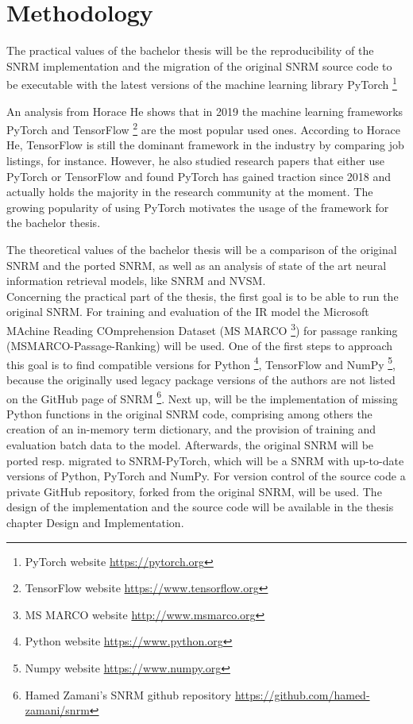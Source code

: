 \chapter{Methodology}

The practical values of the bachelor thesis will be the reproducibility of
    the SNRM implementation and the migration of the original SNRM source 
    code to be executable with the latest versions of the machine learning 
    library PyTorch \footnote{PyTorch website \url{https://pytorch.org}}  

An analysis \cite{he:2019:state-of-ml-frameworks} from Horace He shows that 
    in 2019 the machine learning frameworks PyTorch and TensorFlow 
    \footnote{TensorFlow website \url{https://www.tensorflow.org}}
    are the most popular used ones.
According to Horace He, TensorFlow is still the dominant framework
    in the industry by comparing job listings, for instance.
However, he also studied research papers that either use PyTorch or
    TensorFlow and found PyTorch has gained traction since 2018 and
    actually holds the majority in the research community at the moment.
    \cite{he:2019:state-of-ml-frameworks}
The growing popularity of using PyTorch motivates the usage of the 
    framework for the bachelor thesis.

The theoretical values of the bachelor thesis will be a comparison of 
    the original SNRM and the ported SNRM, as well as an analysis 
    of state of the art neural information retrieval models, 
    like SNRM and NVSM.\\
Concerning the practical part of the thesis, the first goal is to be able 
    to run the original SNRM.
For training and evaluation of the IR model the 
    Microsoft MAchine Reading COmprehension Dataset (MS MARCO 
    \footnote{MS MARCO website \url{http://www.msmarco.org}}) 
    for passage ranking (MSMARCO-Passage-Ranking) will be used.
One of the first steps to approach this goal is to find compatible
    versions for Python \footnote{Python website \url{https://www.python.org}}, 
    TensorFlow and NumPy \footnote{Numpy website \url{https://www.numpy.org}},
    because the originally used legacy package versions of the authors are not
    listed on the GitHub page of SNRM 
    \footnote{Hamed Zamani's SNRM github repository \url{https://github.com/hamed-zamani/snrm}}.
Next up, will be the implementation of missing Python functions in the original SNRM code, 
    comprising among others the creation of an in-memory term dictionary, 
    and the provision of training and evaluation batch data to the model.
Afterwards, the original SNRM will be ported resp. migrated to SNRM-PyTorch, 
    which will be a SNRM with up-to-date versions of Python, PyTorch and NumPy.
For version control of the source code a private GitHub repository, forked from 
    the original SNRM, will be used.
The design of the implementation and the source code will be available in the thesis
    chapter Design and Implementation.

